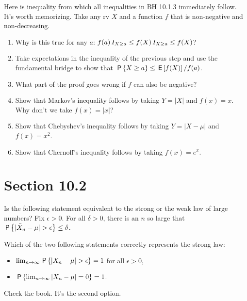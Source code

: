 \begin{exercise}
Here is inequality from which all inequalities in BH 10.1.3 immediately follow. It's worth memorizing.
Take any rv $X$ and a function $f$ that is non-negative and non-decreasing.
\begin{enumerate}
\item Why is this true for any $a$: $f(a) \1{X\geq a} \leq f(X) \1{X\geq a} \leq f(X)$?
\item Take expectations in the inequality of the previous step and use the fundamental bridge to show that $\P{X\geq a} \leq \E{f(X)}/f(a)$.
\item What part of the proof goes wrong if  $f$ can also be negative?
\item Show that Markov's inequality follows by taking $Y=|X|$ and  $f(x)=x$. Why don't we take $f(x) = |x|$?
\item Show that Chebyshev's inequality follows by taking $Y=|X-\mu|$ and $f(x)=x^2$.
\item Show that Chernoff's inequality follows by taking $f(x)=e^{x}$.
\end{enumerate}
\end{exercise}



\section{Section 10.2}
\label{sec:section-10.2}

\begin{exercise}
Is the following statement equivalent to the strong or the weak law of large numbers?
Fix $\epsilon>0$. For all $\delta>0$, there is an $n$ so large that $\P{|\bar X_n-\mu|>\epsilon} \leq \delta$.
\begin{hint}
\end{hint}
\begin{solution}
\end{solution}
\end{exercise}

\begin{exercise}
Which of the two following statements correctly represents the strong law:
\begin{itemize}
\item $\lim_{n\to\infty} \P{|X_n-\mu|>\epsilon} = 1$ for all $\epsilon>0$,
\item $\P{\lim_{n\to\infty} |X_n-\mu|=0} = 1$.
\end{itemize}
\begin{solution}
Check the book. It's the second option.
\end{solution}
\end{exercise}

